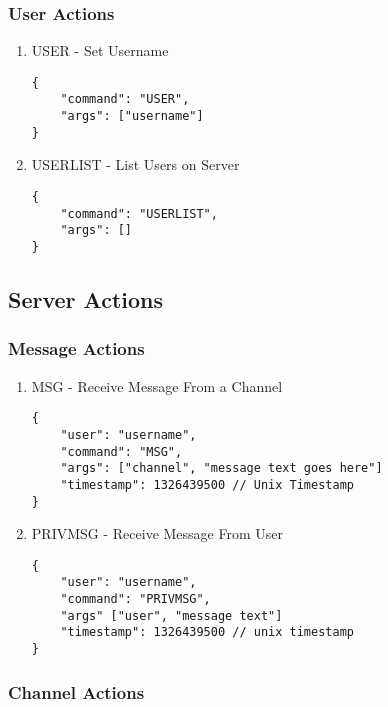 \documentclass[11pt]{article}
\begin{document}
\subsubsection{User Actions}
\label{sec-2-1-3}

\begin{enumerate}
\item USER - Set Username
\label{sec-2-1-3-1}

\lstset{language=js,label= ,caption= ,numbers=none}
\begin{lstlisting}
{
    "command": "USER",
    "args": ["username"]
}
\end{lstlisting}

\item USERLIST - List Users on Server
\label{sec-2-1-3-2}
\lstset{language=js,label= ,caption= ,numbers=none}
\begin{lstlisting}
{
    "command": "USERLIST",
    "args": []
}
\end{lstlisting}
\end{enumerate}
\subsection{Server Actions}
\label{sec-2-2}

\subsubsection{Message Actions}
\label{sec-2-2-1}

\begin{enumerate}
\item MSG - Receive Message From a Channel
\label{sec-2-2-1-1}
\lstset{language=js,label= ,caption= ,numbers=none}
\begin{lstlisting}
{
    "user": "username",
    "command": "MSG",
    "args": ["channel", "message text goes here"]
    "timestamp": 1326439500 // Unix Timestamp
}
\end{lstlisting}

\item PRIVMSG - Receive Message From User
\label{sec-2-2-1-2}
\lstset{language=js,label= ,caption= ,numbers=none}
\begin{lstlisting}
{
    "user": "username",
    "command": "PRIVMSG",
    "args" ["user", "message text"]
    "timestamp": 1326439500 // unix timestamp
}
\end{lstlisting}
\end{enumerate}
\subsubsection{Channel Actions}
\label{sec-2-2-2}
\end{document}
